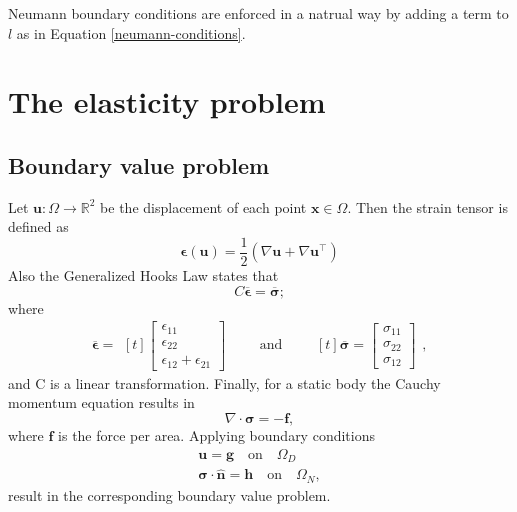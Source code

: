\documentclass[5pt,a4paper,english]{elsarticle}%
\begin{document}
Neumann boundary conditions are enforced in a natrual way by adding a term to $l$ as in Equation \eqref{neumann-conditions}.

\section{The elasticity problem } \label{seq-elasticity}

\subsection{Boundary value problem}
Let $\boldsymbol{u} : \Omega \rightarrow \mathbb{R}^2$ be the displacement of each point $\boldsymbol{x} \in \Omega$. Then the strain tensor is defined as 
\begin{equation} \label{eq-strain-tensor}
    \boldsymbol{\epsilon}(\boldsymbol{u}) = \frac{1}{2}(\nabla \boldsymbol{u} + \nabla \boldsymbol{u}^\intercal)
\end{equation}
Also the Generalized Hooks Law states that
\begin{equation}
    C \boldsymbol{\overline{\epsilon}}  = \boldsymbol{\overline{\sigma}};
    \label{hooks-law}
\end{equation}
where 
\begin{equation*}
    \boldsymbol{\overline{\epsilon}} =\begin{aligned}[t]
    \begin{bmatrix}
        \epsilon_{1 1} \\
        \epsilon_{2 2} \\
        \epsilon_{1 2} + \epsilon_{2 1}
    \end{bmatrix}
    \end{aligned}
    \qquad \text{and} \qquad
    \begin{aligned}[t]
        \boldsymbol{\overline{\sigma}} = \begin{bmatrix}
            \sigma_{1 1} \\
            \sigma_{2 2} \\
            \sigma_{1 2} 
        \end{bmatrix}
    \end{aligned},
\end{equation*}
and C is a linear transformation.
Finally, for a static body the Cauchy momentum equation results in 
\begin{equation} \label{eq-cauchy-momentum}
    \nabla \cdot \boldsymbol{\sigma} = -\boldsymbol{f},
\end{equation}
where $\boldsymbol{f}$ is the force per area. Applying boundary conditions 
\begin{align}
    \boldsymbol{u}  = \boldsymbol{g} \quad \text{on} \quad \Omega_D   \\
    \boldsymbol{\sigma} \cdot \boldsymbol{\hat{n}}  =  \boldsymbol{h} \quad \text{on} \quad \Omega_N,
    \label{elasticity-bc}
\end{align}
result in the corresponding boundary value problem. 
\end{document}
